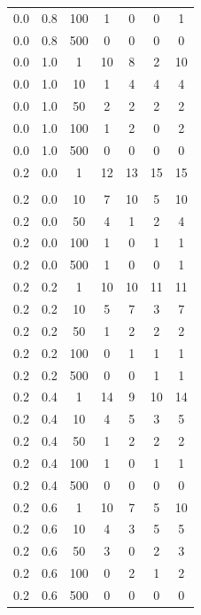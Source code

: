 \begin{longtable}{|c|c|c|c|c|c|c|}
	0.0 &  0.8 &  100 &     1 &     0 &     0 &     1 \\
	0.0 &  0.8 &  500 &     0 &     0 &     0 &     0 \\ \hline
	0.0 &  1.0 &    1 &    10 &     8 &     2 &    10 \\
	0.0 &  1.0 &   10 &     1 &     4 &     4 &     4 \\
	0.0 &  1.0 &   50 &     2 &     2 &     2 &     2 \\
	0.0 &  1.0 &  100 &     1 &     2 &     0 &     2 \\
	0.0 &  1.0 &  500 &     0 &     0 &     0 &     0 \\ \hline
	0.2 &  0.0 &    1 &    12 &    13 &    15 &    15 \\
	\hline
	\pagebreak
	\multicolumn{7}{l}{\textit{Продолжение таблицы}}\\
	\hline
	0.2 &  0.0 &   10 &     7 &    10 &     5 &    10 \\
	0.2 &  0.0 &   50 &     4 &     1 &     2 &     4 \\
	0.2 &  0.0 &  100 &     1 &     0 &     1 &     1 \\
	0.2 &  0.0 &  500 &     1 &     0 &     0 &     1 \\ \hline
	0.2 &  0.2 &    1 &    10 &    10 &    11 &    11 \\
	0.2 &  0.2 &   10 &     5 &     7 &     3 &     7 \\
	0.2 &  0.2 &   50 &     1 &     2 &     2 &     2 \\
	0.2 &  0.2 &  100 &     0 &     1 &     1 &     1 \\
	0.2 &  0.2 &  500 &     0 &     0 &     1 &     1 \\ \hline
	0.2 &  0.4 &    1 &    14 &     9 &    10 &    14 \\
	0.2 &  0.4 &   10 &     4 &     5 &     3 &     5 \\
	0.2 &  0.4 &   50 &     1 &     2 &     2 &     2 \\
	0.2 &  0.4 &  100 &     1 &     0 &     1 &     1 \\
	0.2 &  0.4 &  500 &     0 &     0 &     0 &     0 \\ \hline
	0.2 &  0.6 &    1 &    10 &     7 &     5 &    10 \\
	0.2 &  0.6 &   10 &     4 &     3 &     5 &     5 \\
	0.2 &  0.6 &   50 &     3 &     0 &     2 &     3 \\
	0.2 &  0.6 &  100 &     0 &     2 &     1 &     2 \\
	0.2 &  0.6 &  500 &     0 &     0 &     0 &     0 \\ \hline

\end{longtable}

